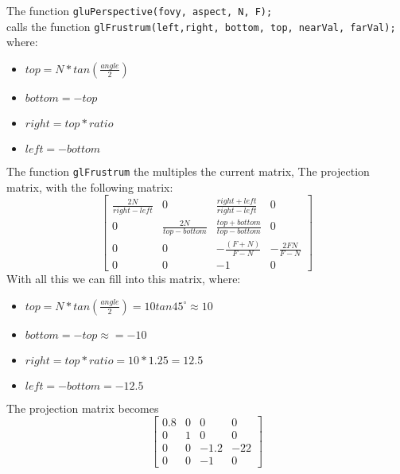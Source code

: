 \documentclass[12pt]{article}
\begin{document}
The function \texttt{gluPerspective(fovy, aspect, N, F);}\\calls the function
\texttt{glFrustrum(left,right, bottom, top, nearVal, farVal);}
where:
\begin{itemize}
    \item $top = N * tan\left( \frac{angle}{2} \right)$
    \item $bottom = -top$
    \item $right=top*ratio$
    \item $left=-bottom$
\end{itemize}
The function \texttt{glFrustrum} the multiples the current matrix, The projection matrix, with the following
matrix:
\begin{equation}
    \begin{bmatrix}
        \frac{2N}{right-left} & 0 & \frac{right+left}{right-left} & 0\\
        0 & \frac{2N}{top-bottom} & \frac{top+bottom}{top-bottom} & 0\\
        0 & 0 & -\frac{(F+N)}{F-N} & -\frac{2FN}{F-N}\\
        0 & 0 & -1 & 0
    \end{bmatrix}
\end{equation}
With all this we can fill into this matrix, where:
\begin{itemize}
    \item $top = N * tan\left( \frac{angle}{2} \right) = 10tan45^{\circ} \approx 10$
    \item $bottom = -top \approx = -10$
    \item $right=top*ratio = 10*1.25 = 12.5$
    \item $left=-bottom = -12.5$
\end{itemize}
The projection matrix becomes
\begin{equation}
    \begin{bmatrix}
        0.8 & 0 & 0 & 0\\
        0 & 1 & 0 & 0\\
        0 & 0 & -1.2 & -22\\
        0 & 0 & -1 & 0
    \end{bmatrix}
\end{equation}
\end{document}
